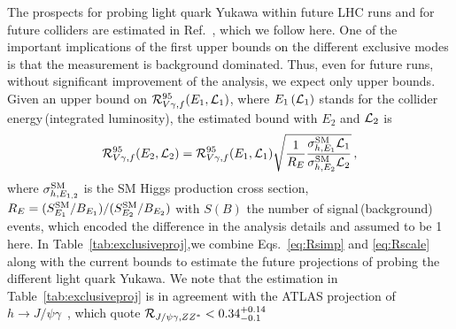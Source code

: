 \documentclass[../report.tex]{subfiles}
\begin{document}
The prospects for probing light quark Yukawa within future LHC runs and for future colliders are estimated in Ref.~\cite{Perez:2015lra}, which we follow here. 
One of the important implications of the first upper bounds on the different exclusive modes is that the measurement is background dominated. Thus, even for future runs, without significant improvement of the analysis, we expect only upper bounds.  
Given an upper bound on $\mathcal{R}^{95}_{V\gamma,f}(E_1,\mathcal{L}_1)$, where $E_1\,(\mathcal{L}_1)$ stands for the collider energy\,(integrated luminosity), the estimated bound with $E_2$ and $\mathcal{L}_2$ is
%
\begin{align}
	\label{eq:Rscale}
	\mathcal{R}^{95}_{V\gamma,f}(E_2,\mathcal{L}_2)
=	\mathcal{R}^{95}_{V\gamma,f}(E_1,\mathcal{L}_1) \sqrt{ \frac{1}{R_E} \frac{\sigma^{\rm SM}_{h,E_1} \mathcal{L}_1  }{\sigma^{\rm SM}_{h,E_2} \mathcal{L}_2} } \, ,
\end{align}
%
where $\sigma^{\rm SM}_{h,E_{1,2}}$ is the SM Higgs production cross section, $R_{E} = (S_{E_1}^{\rm SM}/B_{E_1})/(S_{E_2}^{\rm SM}/B_{E_2})$ with $S(B)$ the number of signal\,(background) events, which encoded the difference in the analysis details and assumed to be 1 here. 
In Table~\ref{tab:exclusiveproj},we combine Eqs.~\eqref{eq:Rsimp} and \eqref{eq:Rscale} along with the current bounds to estimate the future projections of probing the different light quark Yukawa. 
We note that the estimation in Table~\ref{tab:exclusiveproj} is in agreement with the ATLAS projection of $h\to J/\psi\gamma$~\cite{ATL-PHYS-PUB-2015-043}, which quote $\mathcal{R}_{J/\psi\gamma,ZZ^*}<0.34^{+0.14}_{-0.1}$
 
\end{document}
